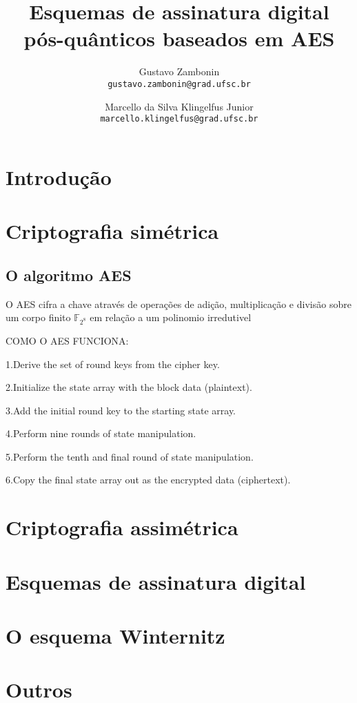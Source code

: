 \documentclass{article}
\title{Esquemas de assinatura digital pós-quânticos baseados em AES}
\author{Gustavo Zambonin \\ \texttt{gustavo.zambonin@grad.ufsc.br} \and Marcello da Silva Klingelfus Junior \\ \texttt{marcello.klingelfus@grad.ufsc.br}}
\date{}
\begin{document}
\maketitle


\section*{Introdução}

\section*{Criptografia simétrica}

\subsection*{O algoritmo AES}

O AES cifra a chave através de operações de adição, multiplicação e divisão sobre um corpo finito $\mathbb{F}_{2^{8}}$ em relação a um polinomio irredutivel 


COMO O AES FUNCIONA:

1.Derive the set of round keys from the cipher key.

2.Initialize the state array with the block data (plaintext).

3.Add the initial round key to the starting state array.

4.Perform nine rounds of state manipulation.

5.Perform the tenth and final round of state manipulation.

6.Copy the final state array out as the encrypted data (ciphertext).


\section*{Criptografia assimétrica}

\section*{Esquemas de assinatura digital}

\section*{O esquema Winternitz}

\section*{Outros}
\end{document}
